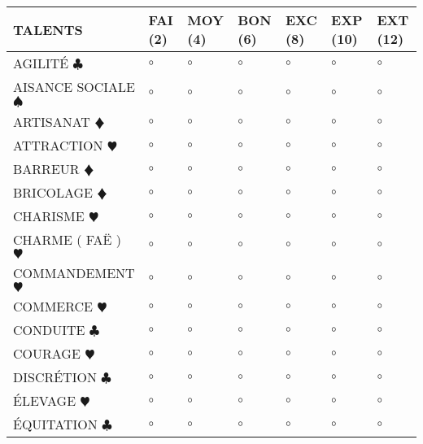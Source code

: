 \documentclass[a5paper]{letter}
\begin{document}
\begin{tabular}[c]{|p{}|p{}|p{}|p{}|p{}|p{}|p{}|}
	\hline
	\textbf{TALENTS}									&	FAI (2)	&	MOY (4)	&	BON (6)	&	EXC (8)	&	EXP (10)	&	EXT (12)	\\ \hline
	AGILITÉ { $\clubsuit$ }								&	$\circ$	&	$\circ$	&	$\circ$	&	$\circ$	&	$\circ$		&	$\circ$		\\ \hline
	AISANCE SOCIALE { $\spadesuit$ }					&	$\circ$	&	$\circ$	&	$\circ$	&	$\circ$	&	$\circ$		&	$\circ$		\\ \hline
	ARTISANAT {\color{red} $\vardiamond$ }				&	$\circ$	&	$\circ$	&	$\circ$	&	$\circ$	&	$\circ$		&	$\circ$		\\ \hline	
	ATTRACTION {\color{red} $\varheart$ }				&	$\circ$	&	$\circ$	&	$\circ$	&	$\circ$	&	$\circ$		&	$\circ$		\\ \hline
	BARREUR {\color{red} $\vardiamond$ }				&	$\circ$	&	$\circ$	&	$\circ$	&	$\circ$	&	$\circ$		&	$\circ$		\\ \hline
	BRICOLAGE {\color{red} $\vardiamond$ }				&	$\circ$	&	$\circ$	&	$\circ$	&	$\circ$	&	$\circ$		&	$\circ$		\\ \hline
	CHARISME {\color{red} $\varheart$ }					&	$\circ$	&	$\circ$	&	$\circ$	&	$\circ$	&	$\circ$		&	$\circ$		\\ \hline
	CHARME ( FAË ) {\color{red} $\varheart$ }			&	$\circ$	&	$\circ$	&	$\circ$	&	$\circ$	&	$\circ$		&	$\circ$		\\ \hline
	COMMANDEMENT {\color{red} $\varheart$ }				&	$\circ$	&	$\circ$	&	$\circ$	&	$\circ$	&	$\circ$		&	$\circ$		\\ \hline
	COMMERCE {\color{red} $\varheart$ }					&	$\circ$	&	$\circ$	&	$\circ$	&	$\circ$	&	$\circ$		&	$\circ$		\\ \hline
	CONDUITE { $\clubsuit$ }							&	$\circ$	&	$\circ$	&	$\circ$	&	$\circ$	&	$\circ$		&	$\circ$		\\ \hline
	COURAGE {\color{red} $\varheart$ }					&	$\circ$	&	$\circ$	&	$\circ$	&	$\circ$	&	$\circ$		&	$\circ$		\\ \hline
	DISCRÉTION { $\clubsuit$ }							&	$\circ$	&	$\circ$	&	$\circ$	&	$\circ$	&	$\circ$		&	$\circ$		\\ \hline
	ÉLEVAGE {\color{red} $\varheart$ }					&	$\circ$	&	$\circ$	&	$\circ$	&	$\circ$	&	$\circ$		&	$\circ$		\\ \hline
	ÉQUITATION { $\clubsuit$ }							&	$\circ$	&	$\circ$	&	$\circ$	&	$\circ$	&	$\circ$		&	$\circ$		\\ \hline

\end{tabular}
\end{document}
